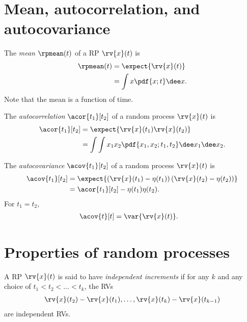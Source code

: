 \section{Mean, autocorrelation, and autocovariance}
\begin{mydefinition}
    The \emph{mean} $\rpmean(t)$ of a RP $\rv{x}(t)$ is 
    \begin{align}
        \rpmean(t) &= \expect{\rv{x}(t)}\\
        &= \int x\pdf{x; t}\dee x.
    \end{align}
    Note that the mean is a function of time.
\end{mydefinition}

\begin{mydefinition}[Autocorrelation]
    The \emph{autocorrelation} $\acor{t_{1}}[t_{2}]$ of a random process $\rv{x}(t)$ is
    \begin{align}
        \acor{t_{1}}[t_{2}] &= \expect{\rv{x}(t_{1})\rv{x}(t_{2})}\\
        &= \int\int x_{1}x_{2}\pdf{x_{1}, x_{2}; t_{1}, t_{2}}\dee x_{1} \dee x_{2}.
    \end{align}
\end{mydefinition}
\begin{mydefinition}[Autocovariance]
    The \emph{autocovariance} $\acov{t_{1}}[t_{2}]$ of a random process $\rv{x}(t)$ is
    \begin{align}
        \acov{t_{1}}[t_{2}] &= \expect{\left(\rv{x}(t_{1}) - \eta(t_{1})\right)\left(\rv{x}(t_{2}) - \eta(t_{2})\right)}\\
        &= \acor{t_{1}}[t_{2}] - \eta(t_{1})\eta(t_{2}).        
    \end{align}
    For $t_{1} = t_{2}$, 
    \begin{align}
        \acov{t}[t] &= \var{\rv{x}(t)}.
    \end{align}
\end{mydefinition}

\section{Properties of random processes}
\begin{mydefinition}
    A RP $\rv{x}(t)$ is said to have \emph{independent increments} if for any $k$ and any choice of $t_{1} < t_{2} < \ldots < t_{k}$, the RVs 
    \begin{align}
        \rv{x}(t_{2}) - \rv{x}(t_{1}), \ldots, \rv{x}(t_{k}) - \rv{x}(t_{k-1})
    \end{align}
    are independent RVs.
\end{mydefinition}


